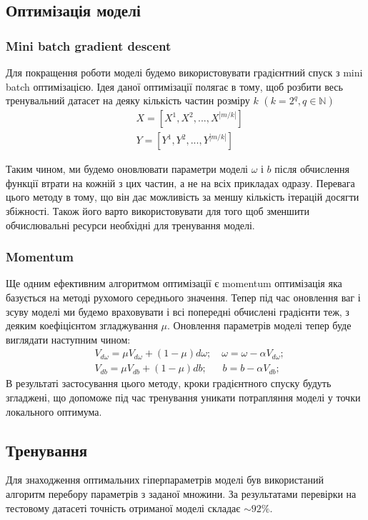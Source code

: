 \documentclass[a4paper,14pt]{extreport}
\begin{document}
	\subsection{Оптимізація моделі}
	\subsubsection{Mini batch gradient descent}
	\noindent
	Для покращення роботи моделі будемо використовувати градієнтний спуск з mini batch  оптимізацією. Ідея даної оптимізації полягає в тому, щоб розбити весь тренувальний датасет на деяку кількість частин розміру $k$ $(k=2^{q}, q \in  \mathbb{N})$
	\begin{align*}
	&X = [X^{1}, X^{2}, ..., X^{|m/k|}]\\
	&Y = [Y^{1}, Y^{2}, ..., Y^{|m/k|}]
	\end{align*}
	
	Таким чином, ми будемо оновлювати параметри моделі $\omega$ і $b$ після обчислення функції втрати на кожній з цих частин, а не на всіх прикладах одразу. Перевага цього методу в тому, що він дає можливість за меншу кількість ітерацій досягти збіжності. Також його варто використовувати для того щоб зменшити обчислювальні ресурси необхідні для тренування моделі.

	\subsubsection{Momentum}
	\noindent
	Ще одним ефективним алгоритмом оптимізації є momentum оптимізація яка базується на методі рухомого середнього значення. Тепер під час оновлення ваг і зсуву моделі ми будемо враховувати і всі попередні обчислені градієнти теж, з деяким коефіцієнтом згладжування $\mu$. Оновлення параметрів моделі тепер буде виглядати наступним чином:
	\begin{align*}
		&V_{d\omega} = \mu V_{d\omega} + (1 - \mu) d\omega; \quad 
		\omega = \omega - \alpha V_{d\omega}; \\
		&V_{db} = \mu V_{db} + (1 - \mu) db; \; \; \quad
		b= b - \alpha V_{db}; 
	\end{align*}
	В результаті застосування цього методу, кроки градієнтного спуску будуть згладжені, що допоможе під час тренування уникати потрапляння моделі у точки локального оптимума.
	
	\subsection{Тренування}
	Для знаходження оптимальних гіперпараметрів моделі був використаний алгоритм перебору параметрів з заданої множини. За результатами перевірки на тестовому датасеті точність отриманої моделі складає $\sim 92\%$.
	
\end{document}

